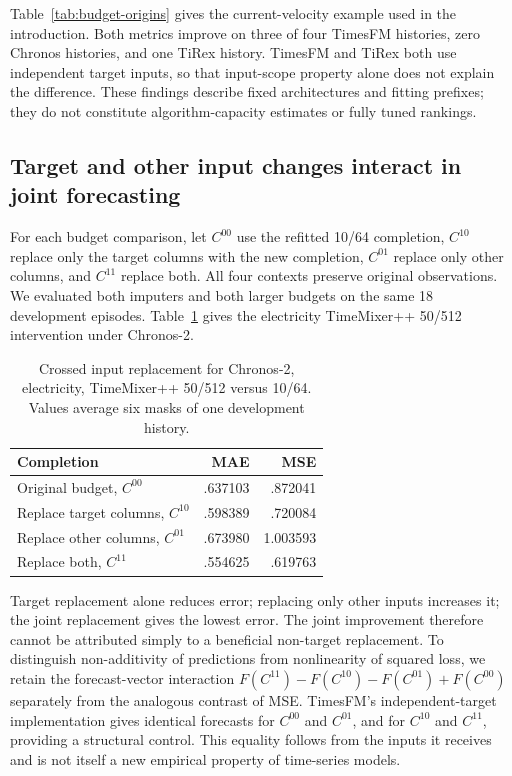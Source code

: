 \documentclass{article}
\begin{document}
Table~\ref{tab:budget-origins} gives the current-velocity example used in the introduction. Both metrics improve on three of four TimesFM histories, zero Chronos histories, and one TiRex history. TimesFM and TiRex both use independent target inputs, so that input-scope property alone does not explain the difference. These findings describe fixed architectures and fitting prefixes; they do not constitute algorithm-capacity estimates or fully tuned rankings.

\subsection{Target and other input changes interact in joint forecasting}

For each budget comparison, let $C^{00}$ use the refitted 10/64 completion, $C^{10}$ replace only the target columns with the new completion, $C^{01}$ replace only other columns, and $C^{11}$ replace both. All four contexts preserve original observations. We evaluated both imputers and both larger budgets on the same 18 development episodes. Table~\ref{tab:crossed} gives the electricity TimeMixer++ 50/512 intervention under Chronos-2.

\begin{table}[t]
\centering\small
\caption{Crossed input replacement for Chronos-2, electricity, TimeMixer++ 50/512 versus 10/64. Values average six masks of one development history.}
\label{tab:crossed}
\begin{tabular}{lrr}
\toprule
Completion & MAE & MSE\\
\midrule
Original budget, $C^{00}$ & .637103 & .872041\\
Replace target columns, $C^{10}$ & .598389 & .720084\\
Replace other columns, $C^{01}$ & .673980 & 1.003593\\
Replace both, $C^{11}$ & .554625 & .619763\\
\bottomrule
\end{tabular}
\end{table}

Target replacement alone reduces error; replacing only other inputs increases it; the joint replacement gives the lowest error. The joint improvement therefore cannot be attributed simply to a beneficial non-target replacement. To distinguish non-additivity of predictions from nonlinearity of squared loss, we retain the forecast-vector interaction $F(C^{11})-F(C^{10})-F(C^{01})+F(C^{00})$ separately from the analogous contrast of MSE. TimesFM's independent-target implementation gives identical forecasts for $C^{00}$ and $C^{01}$, and for $C^{10}$ and $C^{11}$, providing a structural control. This equality follows from the inputs it receives and is not itself a new empirical property of time-series models.
\end{document}
